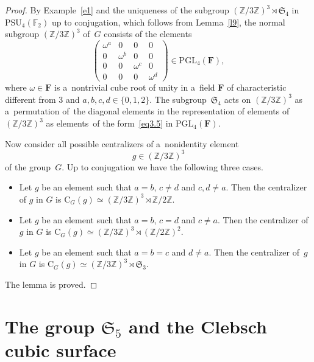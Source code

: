 \documentclass{amsart}
\numberwithin{equation}{section}
\theoremstyle{plain}
\theoremstyle{definition}
\theoremstyle{remark}
\begin{document}
\begin{proof}
 By Example~\ref{e1} and the uniqueness of the subgroup $(\mathbb{Z}/3\mathbb{Z})^3 \rtimes \mathfrak{S}_4$ in $\mathrm{PSU}_4(\mathbb{F}_2)$ up to conjugation, which follows from Lemma~\ref{l9}, the normal subgroup $(\mathbb{Z}/3\mathbb{Z})^3$ of~$G$ consists of the elements
\begin{equation}
\label{eq3.5}
\begin{pmatrix}
\omega^a & 0 & 0 & 0\\
0 & \omega^b & 0 & 0\\
0 & 0 & \omega^c & 0\\
0 & 0 & 0 & \omega^d
\end{pmatrix} \in \mathrm{PGL}_4(\mathbf{F}),
\end{equation}
where $\omega \in \mathbf{F}$ is a~nontrivial cube root of unity in a~field $\mathbf{F}$ of characteristic different from $3$ and $a,b,c,d \in \{0,1,2\}$. The subgroup~$\mathfrak{S}_4$ acts on $(\mathbb{Z}/3\mathbb{Z})^3$ as a~permutation of~the diagonal elements in the representation of elements of $(\mathbb{Z}/3\mathbb{Z})^3$ as elements~of the form~\eqref{eq3.5} in $\mathrm{PGL}_4(\mathbf{F})$.

Now consider all possible centralizers of a~nonidentity element
$$
g \in (\mathbb{Z}/3\mathbb{Z})^3
$$
of the group~$G$. Up to conjugation we have the following three cases.
\begin{itemize}
\item Let $g$ be an element such that $a=b$, $c \neq d$ and $c,d \neq a$. Then the centralizer of $g$ in $G$ is $\mathrm{C}_G(g) \simeq (\mathbb{Z}/3\mathbb{Z})^3 \rtimes \mathbb{Z}/2\mathbb{Z}$.

\item Let $g$ be an element such that $a=b$, $c=d$ and $c \neq a$. Then the centralizer of $g$ in $G$ is $\mathrm{C}_G(g) \simeq (\mathbb{Z}/3\mathbb{Z})^3 \rtimes (\mathbb{Z}/2\mathbb{Z})^2$.

\item Let $g$ be an element such that $a=b=c$ and $d \neq a$. Then the centralizer of~$g$ in $G$ is $\mathrm{C}_G(g) \simeq (\mathbb{Z}/3\mathbb{Z})^3 \rtimes \mathfrak{S}_3$.
\end{itemize}

The lemma is proved.
\end{proof}


\section{The group $\mathfrak{S}_5$ and the Clebsch cubic surface}
\label{s4}
\end{document}
